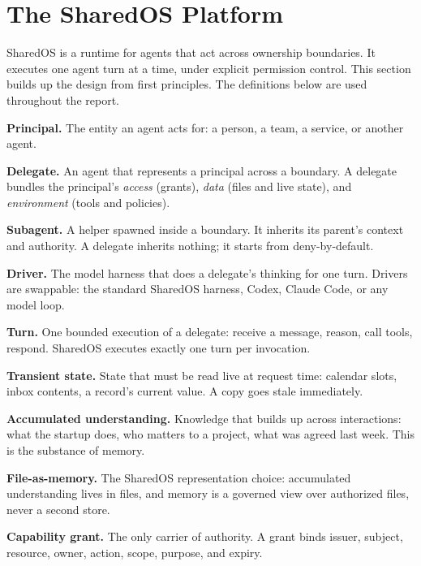 \documentclass[10pt,a4paper]{article}
\newcommand{\dterm}[1]{{\sffamily\bfseries\color{AicooNavy}#1}}
\begin{document}
\section{The SharedOS Platform}
\label{sec:platform}

SharedOS is a runtime for agents that act across ownership boundaries. It executes one agent turn at a time, under explicit permission control. This section builds up the design from first principles. The definitions below are used throughout the report.

\begin{defbox}[Definitions]
\dterm{Principal.} The entity an agent acts for: a person, a team, a service, or another agent.\par
\dterm{Delegate.} An agent that represents a principal across a boundary. A delegate bundles the principal's \emph{access} (grants), \emph{data} (files and live state), and \emph{environment} (tools and policies).\par
\dterm{Subagent.} A helper spawned inside a boundary. It inherits its parent's context and authority. A delegate inherits nothing; it starts from deny-by-default.\par
\dterm{Driver.} The model harness that does a delegate's thinking for one turn. Drivers are swappable: the standard SharedOS harness, Codex, Claude Code, or any model loop.\par
\dterm{Turn.} One bounded execution of a delegate: receive a message, reason, call tools, respond. SharedOS executes exactly one turn per invocation.\par
\dterm{Transient state.} State that must be read live at request time: calendar slots, inbox contents, a record's current value. A copy goes stale immediately.\par
\dterm{Accumulated understanding.} Knowledge that builds up across interactions: what the startup does, who matters to a project, what was agreed last week. This is the substance of memory.\par
\dterm{File-as-memory.} The SharedOS representation choice: accumulated understanding lives in files, and memory is a governed view over authorized files, never a second store.\par
\dterm{Capability grant.} The only carrier of authority. A grant binds issuer, subject, resource, owner, action, scope, purpose, and expiry.
\end{defbox}
\end{document}
